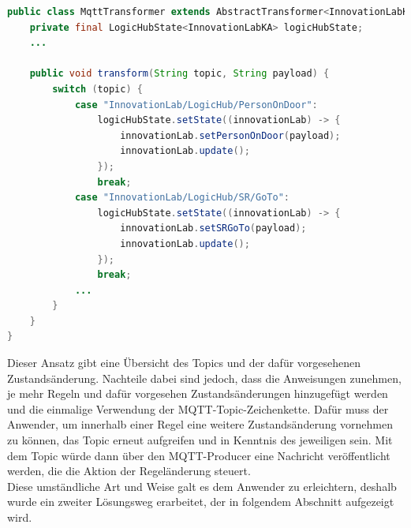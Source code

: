 \begin{lstlisting}[language=Java, frame=lines, xleftmargin=\parindent, style=algoBericht, label={code:switch-case}, captionpos=b, caption={Transformeation über eine Switch-Case-Anweisung}]
public class MqttTransformer extends AbstractTransformer<InnovationLabKA> {
    private final LogicHubState<InnovationLabKA> logicHubState;
    ...

    public void transform(String topic, String payload) {
        switch (topic) {
            case "InnovationLab/LogicHub/PersonOnDoor":
                logicHubState.setState((innovationLab) -> {
                    innovationLab.setPersonOnDoor(payload);
                    innovationLab.update();
                });
                break;
            case "InnovationLab/LogicHub/SR/GoTo":
                logicHubState.setState((innovationLab) -> {
                    innovationLab.setSRGoTo(payload);
                    innovationLab.update();
                });
                break;
            ... 
        }    
    }
}
\end{lstlisting}
    Dieser Ansatz gibt eine Übersicht des Topics und der dafür vorgesehenen Zustandsänderung. Nachteile dabei sind jedoch, dass die Anweisungen 
    zunehmen, je mehr Regeln und dafür vorgesehen Zustandsänderungen hinzugefügt werden und die einmalige Verwendung der \acs{MQTT}-Topic-Zeichenkette. Dafür muss der 
    Anwender, um innerhalb einer Regel eine weitere Zustandsänderung vornehmen zu können, das Topic erneut aufgreifen und in Kenntnis des jeweiligen sein. Mit dem 
    Topic würde dann über den \acs{MQTT}-Producer eine Nachricht veröffentlicht werden, die die Aktion der Regeländerung steuert. 
    \\
    Diese umständliche Art und Weise galt es dem Anwender zu erleichtern, deshalb wurde ein zweiter Lösungsweg erarbeitet, der in folgendem Abschnitt 
    aufgezeigt wird.

